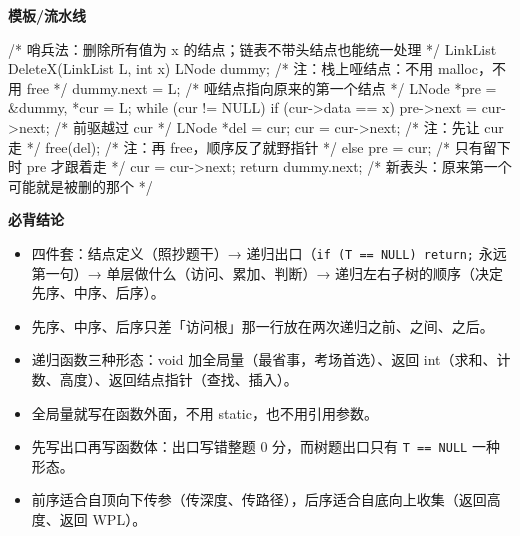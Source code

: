 \documentclass[10pt,a4paper]{ctexart}
\begin{document}
\textbf{模板/流水线}

\begin{codebox}
/* 哨兵法：删除所有值为 x 的结点；链表不带头结点也能统一处理 */
LinkList DeleteX(LinkList L, int x) {
    LNode dummy;                           /* 注：栈上哑结点：不用 malloc，不用 free */
    dummy.next = L;                        /* 哑结点指向原来的第一个结点 */
    LNode *pre = &dummy, *cur = L;
    while (cur != NULL) {
        if (cur->data == x) {
            pre->next = cur->next;         /* 前驱越过 cur */
            LNode *del = cur;
            cur = cur->next;               /* 注：先让 cur 走 */
            free(del);                     /* 注：再 free，顺序反了就野指针 */
        } else {
            pre = cur;                     /* 只有留下时 pre 才跟着走 */
            cur = cur->next;
        }
    }
    return dummy.next;                     /* 新表头：原来第一个可能就是被删的那个 */
}
\end{codebox}





\textbf{必背结论}

\begin{itemize}

\item 四件套：结点定义（照抄题干）→ 递归出口（\texttt{if (T == NULL) return;} 永远第一句）→ 单层做什么（访问、累加、判断）→ 递归左右子树的顺序（决定先序、中序、后序）。

\item 先序、中序、后序只差「访问根」那一行放在两次递归之前、之间、之后。

\item 递归函数三种形态：void 加全局量（最省事，考场首选）、返回 int（求和、计数、高度）、返回结点指针（查找、插入）。

\item 全局量就写在函数外面，不用 static，也不用引用参数。

\item 先写出口再写函数体：出口写错整题 0 分，而树题出口只有 \texttt{T == NULL} 一种形态。

\item 前序适合自顶向下传参（传深度、传路径），后序适合自底向上收集（返回高度、返回 WPL）。

\end{itemize}
\end{document}

